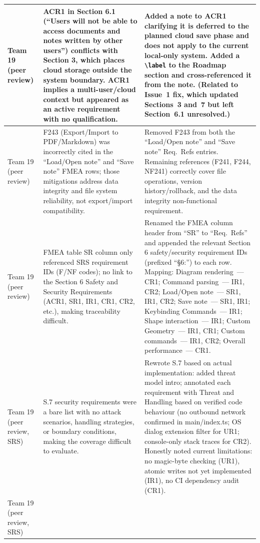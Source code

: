 \documentclass{article}
\begin{document}
\begin{tabularx}{\textwidth}{>{\hsize=0.4\hsize}X >{\hsize=0.8\hsize}X >{\hsize=1.8\hsize}X}
\midrule
Team 19 (peer review) &
  ACR1 in Section 6.1 (``Users will not be able to access documents and notes written by other users'') conflicts with Section 3, which places cloud storage outside the system boundary. ACR1 implies a multi-user/cloud context but appeared as an active requirement with no qualification. &
  Added a note to ACR1 clarifying it is deferred to the planned cloud save phase and does not apply to the current local-only system. Added a \texttt{\textbackslash label} to the Roadmap section and cross-referenced it from the note. (Related to Issue~1 fix, which updated Sections~3 and~7 but left Section~6.1 unresolved.) \\
\midrule
Team 19 (peer review) &
  F243 (Export/Import to PDF/Markdown) was incorrectly cited in the ``Load/Open note'' and ``Save note'' FMEA rows; those mitigations address data integrity and file system reliability, not export/import compatibility. &
  Removed F243 from both the ``Load/Open note'' and ``Save note'' Req.\ Refs entries. Remaining references (F241, F244, NF241) correctly cover file operations, version history/rollback, and the data integrity non-functional requirement. \\
\midrule
Team 19 (peer review) &
  FMEA table SR column only referenced SRS requirement IDs (F/NF codes); no link to the Section 6 Safety and Security Requirements (ACR1, SR1, IR1, CR1, CR2, etc.), making traceability difficult. &
  Renamed the FMEA column header from ``SR'' to ``Req.\ Refs'' and appended the relevant Section 6 safety/security requirement IDs (prefixed ``\S6:'') to each row. Mapping: Diagram rendering~--- CR1; Command parsing~--- IR1, CR2; Load/Open note~--- SR1, IR1, CR2; Save note~--- SR1, IR1; Keybinding Commands~--- IR1; Shape interaction~--- IR1; Custom Geometry~--- IR1, CR1; Custom commands~--- IR1, CR2; Overall performance~--- CR1. \\
\midrule
Team 19 (peer review, SRS) &
  S.7 security requirements were a bare list with no attack scenarios, handling strategies, or boundary conditions, making the coverage difficult to evaluate. &
  Rewrote S.7 based on actual implementation: added threat model intro; annotated each requirement with Threat and Handling based on verified code behaviour (no outbound network confirmed in main/index.ts; OS dialog extension filter for UR1; console-only stack traces for CR2). Honestly noted current limitations: no magic-byte checking (UR1), atomic writes not yet implemented (IR1), no CI dependency audit (CR1). \\
\midrule
Team 19 (peer review, SRS) &

\end{tabularx}
\end{document}
